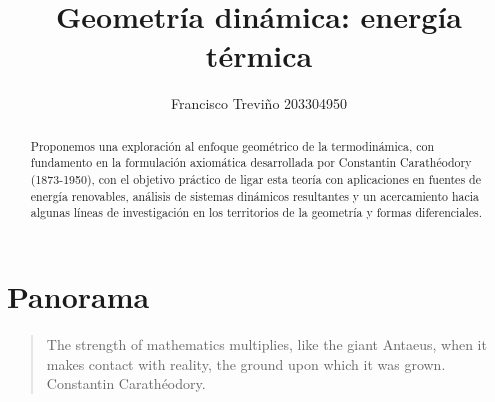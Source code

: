 \documentclass{article}
\author{Francisco Trevi\~no 203304950}
\title{Geometr\'ia din\'amica: energ\'ia t\'ermica}
\theoremstyle{definition} \newtheorem{defi}{Definici\'on}
\theoremstyle{definition} \newtheorem{teo}{Teorema}
\theoremstyle{definition} \newtheorem{cor}{Corolario}
\begin{document}
\maketitle
\begin{abstract}
Proponemos una exploraci\'on al enfoque geom\'etrico de la termodin\'amica, con fundamento en la formulaci\'on axiom\'atica desarrollada por Constantin Carath\'eodory (1873-1950), con el objetivo pr\'actico de ligar esta teor\'ia con aplicaciones en fuentes de energ\'ia renovables, an\'alisis de sistemas din\'amicos resultantes y un acercamiento hacia algunas l\'ineas de investigaci\'on en los territorios de la geometr\'ia y formas diferenciales.
\end{abstract}

\tableofcontents
\section{Panorama}
\begin{quote}
The strength of mathematics multiplies, like the giant Antaeus, when it makes contact with reality, the ground upon which it was grown. Constantin Carath\'eodory.
\end{quote}
\end{document}
